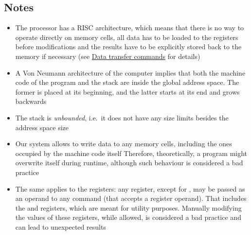 \subsection{Notes}

\begin{itemize}
    \item The  processor has a RISC architecture,
    which means that there is no way to operate directly on memory cells,
    all data has to be loaded to the registers before modifications and
    the results have to be explicitly stored back to the memory if necessary
    (see \hyperlink{cmd:data_transfer}{Data transfer commands} for details)

    \item A Von Neumann architecture of the  computer implies that
    both the machine code of the program and the stack are inside the
    global address space.
    The former is placed at its beginning, and the latter starts at its end
    and grows backwards

    \item The stack is \textit{unbounded}, i.e.\ it does not have any size
    limits besides the address space size

    \item Our system allows to write data to any memory cells, including
    the ones occupied by the machine code itself
    Therefore, theoretically, a program might overwrite itself during runtime,
    although such behaviour is considered a bad practice

    \item The same applies to the registers: any register, except for
    , may be passed as an operand to any command
    (that accepts a register operand).
    That includes the  and  registers, which are meant
    for utility purposes.
    Manually modifying the values of these registers, while allowed,
    is considered a bad practice and can lead to unexpected results
\end{itemize}
